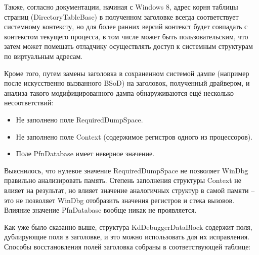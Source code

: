 \documentclass{mipt-thesis-bs}
\begin{document}
Также, согласно документации, начиная с Windows 8, адрес корня таблицы страниц (DirectoryTableBase) в полученном заголовке всегда соответствует системному контексту, но для более ранних версий контекст будет совпадать с контекстом текущего процесса, в том числе может быть пользовательским, что затем может помешать отладчику осуществлять доступ к системным структурам по виртуальным адресам.

Кроме того, путем замены заголовка в сохраненном системой дампе (например после искусственно вызванного BSoD) на заголовок, полученный драйвером, и анализа такого модифицированного дампа обнаруживаются ещё несколько несоответствий:

\begin{itemize}
\item Не заполнено поле RequiredDumpSpace.
\item Не заполнено поле Context (содержимое регистров одного из процессоров).
\item Поле PfnDatabase имеет неверное значение.
\end{itemize}

Выяснилось, что нулевое значение RequiredDumpSpace не позволяет WinDbg правильно анализировать память. Степень заполнения структуры Context не влияет на результат, но влияет значение аналогичных структур в самой памяти -- это не позволяет WinDbg отобразить значения регистров и стека вызовов. Влияние значение PfnDatabase вообще никак не проявляется.

Как уже было сказанно выше, структура KdDebuggerDataBlock содержит поля, дублирующие поля в заголовке, и это можно использовать для их исправления.
Способы восстановления полей заголовка собраны в соответствующей таблице:
\end{document}
